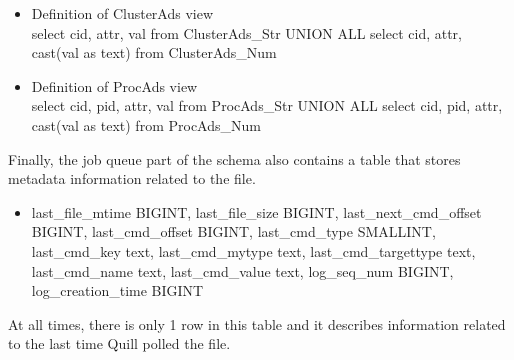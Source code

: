 \begin{itemize}
\item Definition of ClusterAds view\\
		{select cid, 
		attr, 
		val from ClusterAds\_Str UNION ALL
		select cid, 
		attr, 
		cast(val as text) from ClusterAds\_Num}


\item Definition of ProcAds view\\
		{select cid, 
		pid, 
		attr, 
		val from ProcAds\_Str UNION ALL
		select cid, 
		pid, 
		attr, 
		cast(val as text) from ProcAds\_Num}

\end{itemize}

Finally, the job queue part of the schema also contains a table that
stores metadata information related to the  file.

\begin{itemize}
\item {}
        {last\_file\_mtime         BIGINT,
        last\_file\_size          BIGINT,
        last\_next\_cmd\_offset    BIGINT,
        last\_cmd\_offset         BIGINT,
        last\_cmd\_type           SMALLINT,
        last\_cmd\_key            text,
        last\_cmd\_mytype         text,
        last\_cmd\_targettype     text,
        last\_cmd\_name           text,
        last\_cmd\_value          text,
        log\_seq\_num             BIGINT,
        log\_creation\_time       BIGINT}
\end{itemize}
	
At all times, there is only 1 row in this table and it describes
information related to the last time Quill polled the  file.

